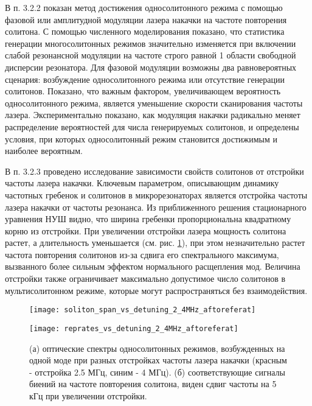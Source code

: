 В п. 3.2.2 показан метод достижения односолитонного режима с помощью фазовой или амплитудной модуляции лазера накачки на частоте повторения солитона. С помощью численного моделирования показано, что статистика генерации многосолитонных режимов значительно изменяется при включении слабой резонансной модуляции на частоте строго равной 1 области свободной дисперсии резонатора. Для фазовой модуляции возможны два равновероятных сценария: возбуждение односолитонного режима или отсутствие генерации солитонов. Показано, что важным фактором, увеличивающем вероятность односолитонного режима, является уменьшение скорости сканирования частоты лазера. Экспериментально показано, как модуляция накачки радикально меняет распределение вероятностей для числа генерируемых солитонов, и определены условия, при которых односолитонный режим становится достижимым и наиболее вероятным.

В п. 3.2.3 проведено исследование зависимости свойств солитонов от отстройки частоты лазера накачки. Ключевым параметром, описывающим динамику частотных гребенок и солитонов в микрорезонаторах является отстройка частоты лазера накачки от частоты резонанса. Из приближенного решения стационарного уравнения НУШ видно, что ширина гребенки пропорциональна квадратному корню из отстройки. При увеличении отстройки лазера мощность солитона растет, а длительность уменьшается (см. рис. \ref{detuning_dependant}), при этом незначительно растет частота повторения солитонов из-за сдвига его спектрального максимума, вызванного более сильным эффектом нормального расщепления мод. Величина отстройки также ограничивает максимально допустимое число солитонов в мультисолитонном режиме, которые могут распространяться без взаимодействия.

\begin{figure}[!htb]
  \begin{minipage}{0.49\linewidth}\centering
    \texttt{[image: soliton\_span\_vs\_detuning\_2\_4MHz\_aftoreferat]}
  \end{minipage}
  \hfill
  \begin{minipage}{0.49\linewidth}\centering
    \texttt{[image: reprates\_vs\_detuning\_2\_4MHz\_aftoreferat]}
  \end{minipage}
  \setlength{\belowcaptionskip}{1pt}
  \caption{(а) оптические спектры односолитонных режимов, возбужденных на одной моде при разных отстройках частоты лазера накачки (красным - отстройка 2.5 МГц, синим - 4 МГц). (б) соответствующие сигналы биений на частоте повторения солитона, виден сдвиг частоты на 5 кГц при увеличении отстройки.}
  \label{detuning_dependant}
\end{figure}

